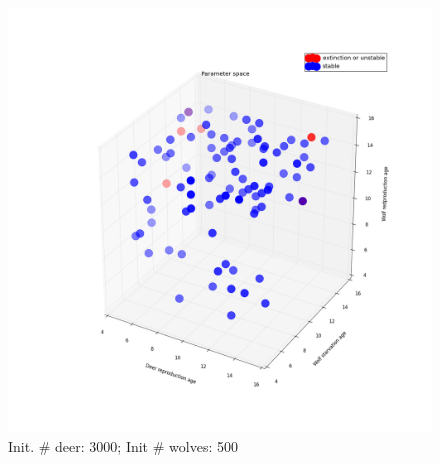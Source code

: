 \documentclass[a4paper,12pt]{article}
\begin{document}
\begin{figure}[ht]
\begin{minipage}[b]{.45\linewidth}
                \includegraphics[width = 1\linewidth]{./pics/Restricted_Parameter_space_d3000_w500.png}
                \caption{Init. $\#$ deer: 3000; Init $\#$ wolves: 500}
                \end{minipage}
  \end{figure}
\end{document}
